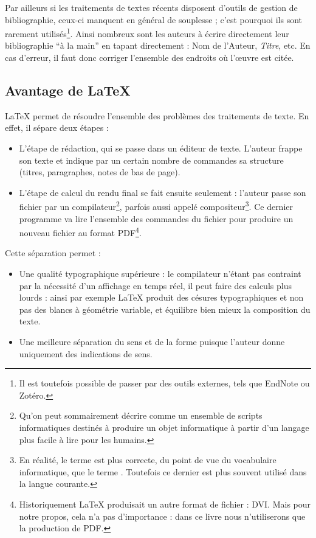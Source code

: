 Par ailleurs si les traitements de textes récents disposent d'outils de gestion de bibliographie, ceux-ci manquent en général de souplesse ; c'est pourquoi ils sont rarement utilisés\footnote{Il est toutefois possible de passer par des outils externes, tels que EndNote ou Zotéro.}. Ainsi nombreux sont les auteurs à écrire directement leur bibliographie \enquote{à la main} en tapant directement : Nom de l'Auteur, \emph{Titre}, etc. En cas d'erreur, il faut donc corriger l'ensemble des endroits où l'œuvre est citée.

\subsection{Avantage de \LaTeX{}}

\LaTeX{} permet de résoudre l'ensemble des problèmes des traitements de texte. En effet, il sépare deux étapes : 

\begin{itemize}
\item L'étape de rédaction, qui se passe dans un éditeur de texte. L'auteur frappe son texte et indique par un certain nombre de commandes sa structure (titres, paragraphes, notes de bas de page).
\item L'étape de calcul du rendu final se fait ensuite seulement  : l'auteur  passe son fichier par un compilateur\footnote{Qu'on peut sommairement décrire comme un ensemble de scripts informatiques destinés à produire un objet informatique à partir d'un langage plus facile à lire pour les humains.}, parfois aussi appelé compositeur\footnote{En réalité, le terme  est plus correcte, du point de vue du vocabulaire informatique, que le terme . Toutefois ce dernier est plus souvent utilisé dans la langue courante.}. Ce dernier programme va lire l'ensemble des commandes du fichier pour produire un nouveau fichier au format PDF\footnote{Historiquement \LaTeX{} produisait un autre format de fichier : DVI. Mais pour notre propos, cela n'a pas d'importance : dans ce livre nous n'utiliserons que la production de PDF.}.
\end{itemize}

Cette séparation permet :
\begin{itemize}
\item Une qualité typographique supérieure :  le compilateur n'étant pas contraint par la nécessité d'un affichage en temps réel, il peut faire des calculs plus lourds : ainsi par exemple \LaTeX{} produit des césures typographiques et non pas des blancs à géométrie variable, et équilibre bien mieux la composition du texte.
\item Une meilleure séparation du sens et de la forme puisque l'auteur donne uniquement des indications de sens.
\end{itemize}

